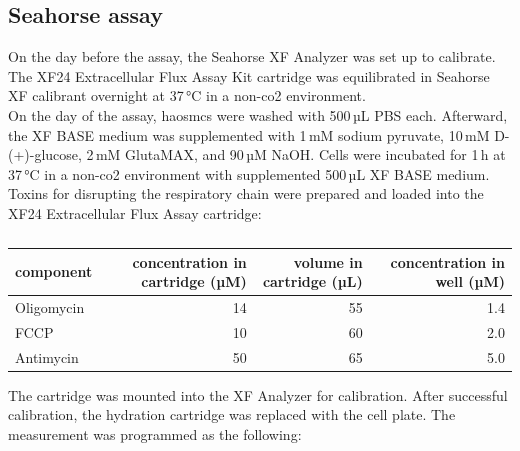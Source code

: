     \subsection{Seahorse assay}
    On the day before the assay, the Seahorse XF Analyzer was set up to calibrate. The XF24 Extracellular Flux Assay Kit cartridge was equilibrated in Seahorse XF calibrant overnight at 37\,°C in a non-\ac{co2} environment.\\
    On the day of the assay, \acp{haosmc} were washed with 500\,µL PBS each. Afterward, the XF BASE medium was supplemented with 1\,mM sodium pyruvate, 10\,mM D-(+)-glucose, 2\,mM GlutaMAX\texttrademark, and 90\,µM NaOH. Cells were incubated for 1\,h at 37\,°C in a non-\ac{co2} environment with supplemented 500\,µL XF BASE medium. Toxins for disrupting the respiratory chain were prepared and loaded into the XF24 Extracellular Flux Assay cartridge:

    \begin{table}[h]
    \capstart
    \centering
    \begin{minipage}{\captionwidth}
        \caption[toxins for seahorse]{}
        \label{tab:seahorse_toxins}
    \end{minipage}
    \begin{tabular}{|l|r|r|r|}
        \hline
        component  & concentration in cartridge (µM) & volume in cartridge (µL) & concentration in well (µM) \\ \hline
        Oligomycin & 14                             & 55                      & 1.4                        \\
        FCCP       & 10                             & 60                      & 2.0                        \\
        Antimycin  & 50                             & 65                      & 5.0                        \\ \hline
    \end{tabular}
    \end{table}

    The cartridge was mounted into the XF Analyzer for calibration. After successful calibration, the hydration cartridge was replaced with the cell plate. The measurement was programmed as the following:

